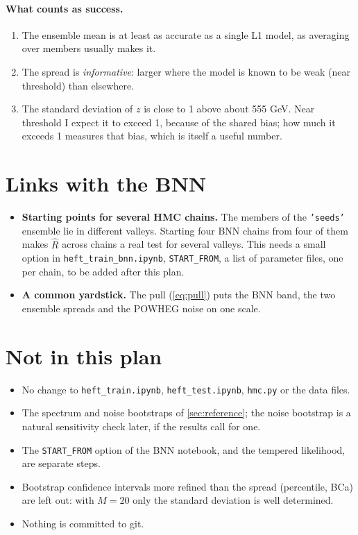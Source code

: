 \documentclass[11pt]{article}
\newcommand{\file}[1]{\nolinkurl{#1}}
\newcommand{\code}[1]{\texttt{#1}}
\begin{document}
\paragraph{What counts as success.}
\begin{enumerate}
  \item The ensemble mean is at least as accurate as a single L1 model, as averaging over
    members usually makes it.
  \item The spread is \emph{informative}: larger where the model is known to be weak (near
    threshold) than elsewhere.
  \item The standard deviation of $z$ is close to 1 above about 555 GeV. Near threshold I
    expect it to exceed 1, because of the shared bias; how much it exceeds 1 measures that
    bias, which is itself a useful number.
\end{enumerate}

\section{Links with the BNN}

\begin{itemize}
  \item \textbf{Starting points for several HMC chains.} The members of the
    \code{'seeds'} ensemble lie in different valleys. Starting four BNN chains from four of
    them makes $\hat R$ across chains a real test for several valleys. This needs a small
    option in \file{heft_train_bnn.ipynb}, \code{START\_FROM}, a list of parameter files,
    one per chain, to be added after this plan.
  \item \textbf{A common yardstick.} The pull (\ref{eq:pull}) puts the BNN band, the two
    ensemble spreads and the POWHEG noise on one scale.
\end{itemize}

\section{Not in this plan}
\begin{itemize}
  \item No change to \file{heft_train.ipynb}, \file{heft_test.ipynb}, \file{hmc.py} or the
    data files.
  \item The spectrum and noise bootstraps of \cref{sec:reference}; the noise bootstrap is
    a natural sensitivity check later, if the results call for one.
  \item The \code{START\_FROM} option of the BNN notebook, and the tempered likelihood,
    are separate steps.
  \item Bootstrap confidence intervals more refined than the spread (percentile, BCa) are
    left out: with $M = 20$ only the standard deviation is well determined.
  \item Nothing is committed to git.
\end{itemize}
\end{document}
